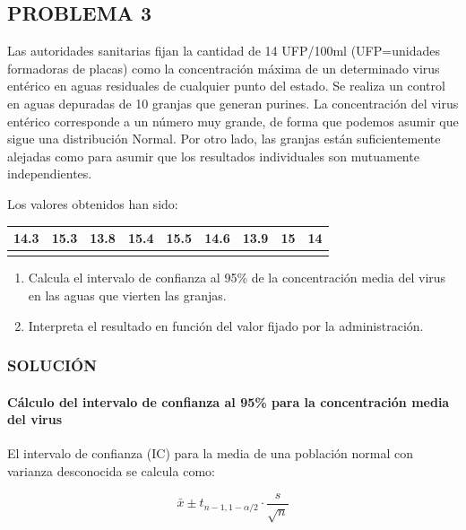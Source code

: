 \documentclass[
]{article}
\providecommand{\tightlist}{%
  \setlength{\itemsep}{0pt}\setlength{\parskip}{0pt}}
\begin{document}
\subsection{PROBLEMA 3}\label{problema-3-1}

Las autoridades sanitarias fijan la cantidad de 14 UFP/100ml (UFP=unidades formadoras de placas) como la concentración máxima de un determinado virus entérico en aguas residuales de cualquier punto del estado. Se realiza un control en aguas depuradas de 10 granjas que generan purines. La concentración del virus entérico corresponde a un número muy grande, de forma que podemos asumir que sigue una distribución Normal. Por otro lado, las granjas están suficientemente alejadas como para asumir que los resultados individuales son mutuamente independientes.

Los valores obtenidos han sido:

\begin{longtable}[]{@{}lllllllll@{}}
\toprule\noalign{}
14.3 & 15.3 & 13.8 & 15.4 & 15.5 & 14.6 & 13.9 & 15 & 14 \\
\midrule\noalign{}
\endhead
\bottomrule\noalign{}
\endlastfoot
\end{longtable}

\begin{enumerate}
\def\labelenumi{\arabic{enumi}.}
\tightlist
\item
  Calcula el intervalo de confianza al 95\% de la concentración media del virus en las aguas que vierten las granjas.\\
\item
  Interpreta el resultado en función del valor fijado por la administración.
\end{enumerate}

\subsubsection{SOLUCIÓN}\label{soluciuxf3n-17}

\paragraph{Cálculo del intervalo de confianza al 95\% para la concentración media del virus}\label{cuxe1lculo-del-intervalo-de-confianza-al-95-para-la-concentraciuxf3n-media-del-virus}

El intervalo de confianza (IC) para la media de una población normal con varianza desconocida se calcula como:

\[ \bar{x} \pm t_{n-1, 1-\alpha/2} \cdot \frac{s}{\sqrt{n}} \]
\end{document}

